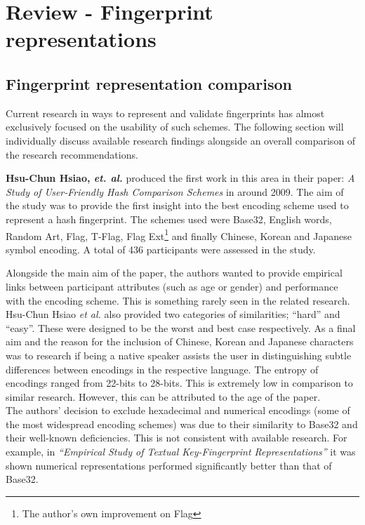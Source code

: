 \section{Review - Fingerprint representations}

\subsection{Fingerprint representation comparison}

Current research in ways to represent and validate fingerprints has almost exclusively focused on the usability of such schemes. The following section will individually discuss available research findings alongside an overall comparison of the research recommendations.

\textbf{Hsu-Chun Hsiao, \textit{et. al.}} produced the first work in this area in their paper: \textit{A Study of User-Friendly Hash Comparison Schemes}\cite{hsiao2009study} in around 2009. The aim of the study was to provide the first insight into the best encoding scheme used to represent a hash fingerprint. The schemes used were Base32, English words, Random Art\cite{perrig1999hash}, Flag\cite{ellison2003public}, T-Flag\cite{lin2010spate}, Flag Ext\footnote{The author's own improvement on Flag} and finally Chinese, Korean and Japanese symbol encoding. A total of 436 participants were assessed in the study.

Alongside the main aim of the paper, the authors wanted to provide empirical links between participant attributes (such as age or gender) and performance with the encoding scheme. This is something rarely seen in the related research. Hsu-Chun Hsiao \textit{et al.} also provided two categories of similarities; ``hard'' and ``easy''. These were designed to be the worst and best case respectively. As a final aim and the reason for the inclusion of Chinese, Korean and Japanese characters was to research if being a native speaker assists the user in distinguishing subtle differences between encodings in the respective language. The entropy of encodings ranged from 22-bits to 28-bits. This is extremely low in comparison to similar research. However, this can be attributed to the age of the paper. \\
The authors' decision to exclude hexadecimal and numerical encodings (some of the most widespread encoding schemes) was due to their similarity to Base32 and their well-known deficiencies. This is not consistent with available research. For example, in \textit{``Empirical Study of Textual Key-Fingerprint Representations''}\cite{dechand2016empirical} it was shown numerical representations performed significantly better than that of Base32.

